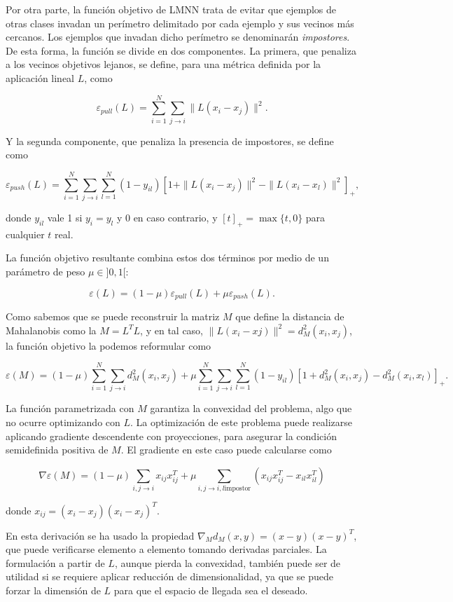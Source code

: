 Por otra parte, la función objetivo de LMNN trata de evitar que ejemplos de otras clases invadan un perímetro delimitado por cada ejemplo y sus vecinos más cercanos. Los ejemplos que invadan dicho perímetro se denominarán \emph{impostores}. De esta forma, la función se divide en dos componentes. La primera, que penaliza a los vecinos objetivos lejanos, se define, para una métrica definida por la aplicación lineal $L$, como

\[ \varepsilon_{pull}(L) = \sum_{i=1}^N\sum_{j\to i} \|L(x_i - x_j)\|^2. \]

Y la segunda componente, que penaliza la presencia de impostores, se define como

\[ \varepsilon_{push}(L) = \sum_{i=1}^N\sum_{j\to i}\sum_{l=1}^N(1-y_{il})[1+\|L(x_i - x_j)\|^2 - \|L(x_i - x_l)\|^2]_+, \]

donde $y_{il}$ vale 1 si $y_i = y_l$ y 0 en caso contrario, y $[t]_+ = \max\{t, 0\}$ para cualquier $t$ real.

La función objetivo resultante combina estos dos términos por medio de un parámetro de peso $\mu \in ]0, 1[$:

\[ \varepsilon(L) = (1-\mu)\varepsilon_{pull}(L) + \mu\varepsilon_{push}(L). \]

Como sabemos que se puede reconstruir la matriz $M$ que define la distancia de Mahalanobis como la $M = L^TL$, y en tal caso, $\|L(x_i - xj)\|^2 = d_M^2(x_i, x_j)$, la función objetivo la podemos reformular como 

\[ \varepsilon(M) =  (1-\mu)\sum_{i=1}^N\sum_{j\to i} d_M^2(x_i, x_j) + \mu \sum_{i=1}^N\sum_{j\to i}\sum_{l=1}^N(1-y_{il})[1+d_M^2(x_i, x_j) - d_M^2(x_i, x_l)]_+. \]

La función parametrizada con $M$ garantiza la convexidad del problema, algo que no ocurre optimizando con $L$. La optimización de este problema puede realizarse aplicando gradiente descendente con proyecciones, para asegurar la condición semidefinida positiva de $M$. El gradiente en este caso puede calcularse como

\[ \nabla \varepsilon(M) = (1-\mu)\sum_{i, j\to i} x_{ij}x_{ij}^T + \mu \sum_{i, j \to i, l \text{impostor}} (x_{ij}x_{ij}^T - x_{il}x_{il}^T) \]

donde $x_{ij} = (x_i - x_j)(x_i - x_j)^T$.

En esta derivación se ha usado la propiedad $\nabla_Md_M(x,y) = (x-y)(x-y)^T$, que puede verificarse elemento a elemento tomando derivadas parciales. La formulación a partir de $L$, aunque pierda la convexidad, también puede ser de utilidad si se requiere aplicar reducción de dimensionalidad, ya que se puede forzar la dimensión de $L$ para que el espacio de llegada sea el deseado.

